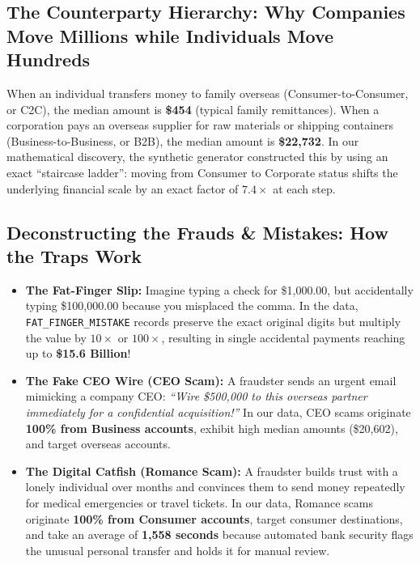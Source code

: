 \documentclass[11pt,a4paper]{article}
\begin{document}
\subsection{The Counterparty Hierarchy: Why Companies Move Millions while Individuals Move Hundreds}
When an individual transfers money to family overseas (Consumer-to-Consumer, or C2C), the median amount is \textbf{\$454} (typical family remittances). When a corporation pays an overseas supplier for raw materials or shipping containers (Business-to-Business, or B2B), the median amount is \textbf{\$22,732}. 
In our mathematical discovery, the synthetic generator constructed this by using an exact ``staircase ladder'': moving from Consumer to Corporate status shifts the underlying financial scale by an exact factor of \textbf{$7.4\times$} at each step.

\subsection{Deconstructing the Frauds \& Mistakes: How the Traps Work}
\begin{itemize}
    \item \textbf{The Fat-Finger Slip:} Imagine typing a check for \$1,000.00, but accidentally typing \$100,000.00 because you misplaced the comma. In the data, \texttt{FAT\_FINGER\_MISTAKE} records preserve the exact original digits but multiply the value by $10\times$ or $100\times$, resulting in single accidental payments reaching up to \textbf{\$15.6 Billion}!
    \item \textbf{The Fake CEO Wire (CEO Scam):} A fraudster sends an urgent email mimicking a company CEO: \textit{``Wire \$500,000 to this overseas partner immediately for a confidential acquisition!''} In our data, CEO scams originate \textbf{100\% from Business accounts}, exhibit high median amounts (\$20,602), and target overseas accounts.
    \item \textbf{The Digital Catfish (Romance Scam):} A fraudster builds trust with a lonely individual over months and convinces them to send money repeatedly for medical emergencies or travel tickets. In our data, Romance scams originate \textbf{100\% from Consumer accounts}, target consumer destinations, and take an average of \textbf{1,558 seconds} because automated bank security flags the unusual personal transfer and holds it for manual review.
\end{itemize}

\end{document}
